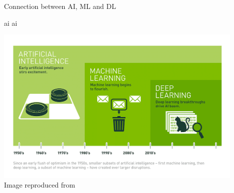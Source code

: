 \begin{frame}{Connection between AI, ML and DL}

\gls{ai}
\gls{ai}

    \begin{center}
        \includegraphics[width=0.90\textwidth]{./images/dl_intro/ai_ml_dl.png}\\
        {\scriptsize Image reproduced from \cite{NVidiaBlog:DifferenceBetweenAIMLDL}}\\
    \end{center}

\end{frame}
    
